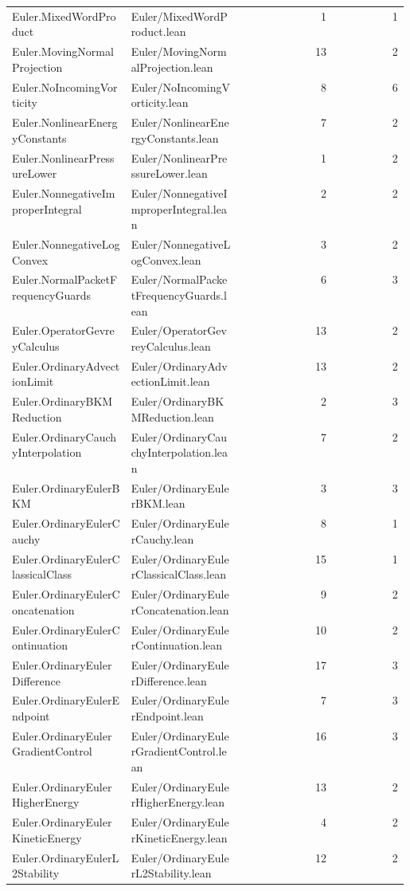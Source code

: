 \begin{longtable}{p{0.30\linewidth}p{0.28\linewidth}rr}
Euler.MixedWordProduct & Euler/MixedWordProduct.lean & 1 & 1\\
Euler.MovingNormalProjection & Euler/MovingNormalProjection.lean & 13 & 2\\
Euler.NoIncomingVorticity & Euler/NoIncomingVorticity.lean & 8 & 6\\
Euler.NonlinearEnergyConstants & Euler/NonlinearEnergyConstants.lean & 7 & 2\\
Euler.NonlinearPressureLower & Euler/NonlinearPressureLower.lean & 1 & 2\\
Euler.NonnegativeImproperIntegral & Euler/NonnegativeImproperIntegral.lean & 2 & 2\\
Euler.NonnegativeLogConvex & Euler/NonnegativeLogConvex.lean & 3 & 2\\
Euler.NormalPacketFrequencyGuards & Euler/NormalPacketFrequencyGuards.lean & 6 & 3\\
Euler.OperatorGevreyCalculus & Euler/OperatorGevreyCalculus.lean & 13 & 2\\
Euler.OrdinaryAdvectionLimit & Euler/OrdinaryAdvectionLimit.lean & 13 & 2\\
Euler.OrdinaryBKMReduction & Euler/OrdinaryBKMReduction.lean & 2 & 3\\
Euler.OrdinaryCauchyInterpolation & Euler/OrdinaryCauchyInterpolation.lean & 7 & 2\\
Euler.OrdinaryEulerBKM & Euler/OrdinaryEulerBKM.lean & 3 & 3\\
Euler.OrdinaryEulerCauchy & Euler/OrdinaryEulerCauchy.lean & 8 & 1\\
Euler.OrdinaryEulerClassicalClass & Euler/OrdinaryEulerClassicalClass.lean & 15 & 1\\
Euler.OrdinaryEulerConcatenation & Euler/OrdinaryEulerConcatenation.lean & 9 & 2\\
Euler.OrdinaryEulerContinuation & Euler/OrdinaryEulerContinuation.lean & 10 & 2\\
Euler.OrdinaryEulerDifference & Euler/OrdinaryEulerDifference.lean & 17 & 3\\
Euler.OrdinaryEulerEndpoint & Euler/OrdinaryEulerEndpoint.lean & 7 & 3\\
Euler.OrdinaryEulerGradientControl & Euler/OrdinaryEulerGradientControl.lean & 16 & 3\\
Euler.OrdinaryEulerHigherEnergy & Euler/OrdinaryEulerHigherEnergy.lean & 13 & 2\\
Euler.OrdinaryEulerKineticEnergy & Euler/OrdinaryEulerKineticEnergy.lean & 4 & 2\\
Euler.OrdinaryEulerL2Stability & Euler/OrdinaryEulerL2Stability.lean & 12 & 2\\

\end{longtable}
